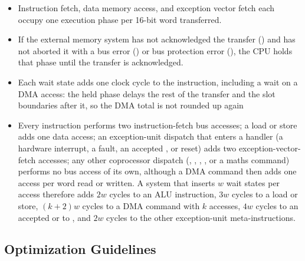 \begin{itemize}
	\item Instruction fetch, data memory access, and exception vector fetch each occupy one execution phase per 16-bit word
	      transferred.
	\item If the external memory system has not acknowledged the transfer () and has not aborted it with a bus
	      error () or bus protection error (), the CPU holds that phase until the transfer is
	      acknowledged.
	\item Each wait state adds one clock cycle to the instruction, including a wait on a DMA access: the held phase delays the
	      rest of the transfer and the slot boundaries after it, so the DMA total is not rounded up again
	\item Every instruction performs two instruction-fetch bus accesses; a load or store adds one data access; an exception-unit
	      dispatch that enters a handler (a hardware interrupt, a fault, an accepted , or reset) adds two
	      exception-vector-fetch accesses; any other coprocessor dispatch (, , ,
	      , or a maths command) performs no bus access of its own, although a DMA command then adds one access per
	      word read or written. A system that inserts $w$ wait states per access therefore adds $2w$ cycles to an ALU
	      instruction, $3w$ cycles to a load or store, $(k + 2)w$ cycles to a DMA command with $k$ accesses, $4w$ cycles to an
	      accepted  or to , and $2w$ cycles to the other exception-unit meta-instructions.
\end{itemize}

\subsection{Optimization Guidelines}

